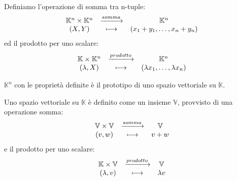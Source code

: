 \documentclass[a4paper,12pt]{article}
\begin{document}
	Definiamo l'operazione di somma tra n-tuple:
	\[
	\begin{array}{c c c}
		\mathbb{K}^n \times \mathbb{K}^n & \xlongrightarrow{somma} & \mathbb{K}^n \\
		(X, Y) & \longmapsto & (x_1 + y_1, \dots, x_n + y_n) \\
	\end{array}
	\]	
	ed il prodotto per uno scalare:
	\[
	\begin{array}{c c c}
		\mathbb{K} \times \mathbb{K}^n & \xlongrightarrow{prodotto} & \mathbb{K}^n \\
		(\lambda, X) & \longmapsto & (\lambda x_1, \dots, \lambda x_n) \\
	\end{array}
	\]	

	$\mathbb{K}^n$ con le proprietà definite è il prototipo di uno spazio vettoriale su $\mathbb{K}$.
	
	Uno spazio vettoriale su $\mathbb{K}$ è definito come un insieme $\mathbb{V}$, provvisto di una operazione somma:
	\[
	\begin{array}{c c c}
		\mathbb{V} \times \mathbb{V} & \xlongrightarrow{somma} & \mathbb{V} \\
		(v, w) & \longmapsto & v + w \\
	\end{array}
	\]	
	e il prodotto per uno scalare:
	\[
	\begin{array}{c c c}
		\mathbb{K} \times \mathbb{V} & \xlongrightarrow{prodotto} & \mathbb{V} \\
		(\lambda, v) & \longmapsto & \lambda v \\
	\end{array}
	\]	
	
\end{document}
